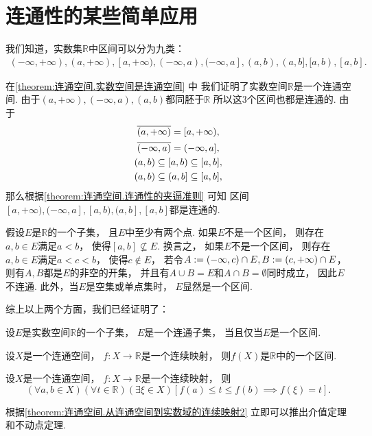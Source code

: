 \section{连通性的某些简单应用}
我们知道，实数集\(\mathbb{R}\)中区间可以分为九类：\begin{gather*}
	(-\infty,+\infty),
	(a,+\infty),
	[a,+\infty),
	(-\infty,a),
	(-\infty,a],
	(a,b),
	(a,b],
	[a,b),
	[a,b].
\end{gather*}

在\cref{theorem:连通空间.实数空间是连通空间} 中
我们证明了实数空间\(\mathbb{R}\)是一个连通空间.
由于\((a,+\infty),(-\infty,a),(a,b)\)都同胚于\(\mathbb{R}\)
所以这3个区间也都是连通的.
由于\begin{gather*}
	\overline{(a,+\infty)}
	= [a,+\infty), \\
	\overline{(-\infty,a)}
	= (-\infty,a], \\
	(a,b) \subseteq [a,b) \subseteq [a,b], \\
	(a,b) \subseteq (a,b] \subseteq [a,b],
\end{gather*}
那么根据\cref{theorem:连通空间.连通性的夹逼准则} 可知
区间\([a,+\infty),(-\infty,a],[a,b),(a,b],[a,b]\)都是连通的.

假设\(E\)是\(\mathbb{R}\)的一个子集，
且\(E\)中至少有两个点.
如果\(E\)不是一个区间，
则存在\(a,b \in E\)满足\(a < b\)，
使得\([a,b] \not\subseteq E\).
换言之，
如果\(E\)不是一个区间，
则存在\(a,b \in E\)满足\(a < c < b\)，
使得\(c \notin E\)，
若令\(A := (-\infty,c) \cap E,
B := (c,+\infty) \cap E\)，
则有\(A,B\)都是\(E\)的非空的开集，
并且有\(A \cup B = E\)和\(A \cap B = \emptyset\)同时成立，
因此\(E\)不连通.
此外，当\(E\)是空集或单点集时，
\(E\)显然是一个区间.

综上以上两个方面，我们已经证明了：
\begin{theorem}
设\(E\)是实数空间\(\mathbb{R}\)的一个子集，
\(E\)是一个连通子集，
当且仅当\(E\)是一个区间.
\end{theorem}

\begin{theorem}\label{theorem:连通空间.从连通空间到实数域的连续映射1}
设\(X\)是一个连通空间，
\(f\colon X \to \mathbb{R}\)是一个连续映射，
则\(f(X)\)是\(\mathbb{R}\)中的一个区间.
\end{theorem}

\begin{theorem}\label{theorem:连通空间.从连通空间到实数域的连续映射2}
设\(X\)是一个连通空间，
\(f\colon X \to \mathbb{R}\)是一个连续映射，
则\begin{equation*}
	(\forall a,b \in X)
	(\forall t\in\mathbb{R})
	(\exists \xi \in X)
	[
		f(a) \leq t \leq f(b)
		\implies
		f(\xi) = t
	].
\end{equation*}
\end{theorem}
根据\cref{theorem:连通空间.从连通空间到实数域的连续映射2} 立即可以推出介值定理和不动点定理.


